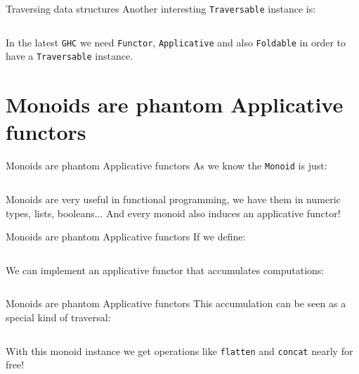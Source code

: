 \documentclass[10pt]{beamer}
\begin{document}
\begin{frame}{Traversing data structures}
  Another interesting \verb~Traversable~ instance is:

  \inputminted{haskell}{./src/Traversable_tree.hs}

  In the latest \verb~GHC~ we need \verb~Functor~, \verb~Applicative~
  and also \verb~Foldable~ in order to have a \verb~Traversable~
  instance.
\end{frame}

\section{Monoids are phantom Applicative functors}

\begin{frame}{Monoids are phantom Applicative functors}
  As we know the \verb~Monoid~ is just:

  \inputminted{haskell}{./src/Monoid.hs}

  Monoids are very useful in functional programming, we have them in
  numeric types, lists, booleans... And every monoid also induces an
  applicative functor!

\end{frame}

\begin{frame}{Monoids are phantom Applicative functors}
  If we define:

  \inputminted{haskell}{./src/Accy.hs}

  We can implement an applicative functor that accumulates
  computations:

  \inputminted{haskell}{./src/Monoid_applicative.hs}
\end{frame}

\begin{frame}{Monoids are phantom Applicative functors}
  This accumulation can be seen as a special kind of traversal:

  \inputminted{haskell}{./src/acc_red.hs}

  With this monoid instance we get operations like \verb~flatten~ and
  \verb~concat~ nearly for free!

  \inputminted{haskell}{./src/flatten_concat_monoid.hs}
\end{frame}

\end{document}
